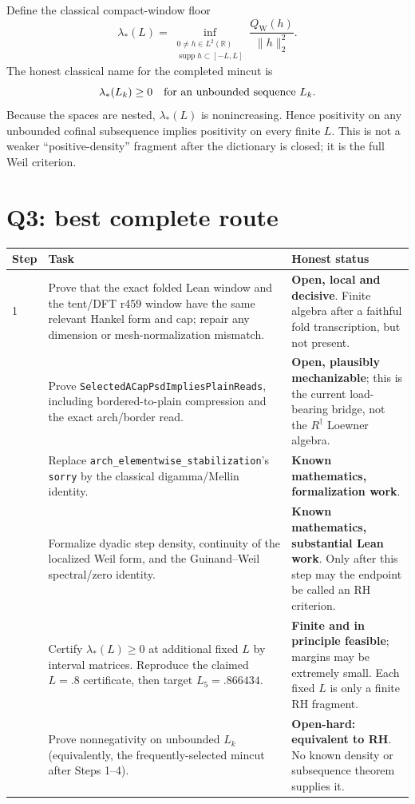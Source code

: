 \documentclass[11pt]{article}
\newcommand{\QW}{Q_{\mathrm W}}
\newcommand{\Rd}{R^{\dagger}}
\begin{document}
Define the classical compact-window floor
\[
 \lambda_*(L)=
 \inf_{\substack{0\ne h\in L^2(\mathbb R)\\
                  \operatorname{supp}h\subset[-L,L]}}
 \frac{\QW(h)}{\|h\|_2^2}.
\]
The honest classical name for the completed mincut is
\[
 \lambda_*(L_k)\ge0\quad\hbox{for an unbounded sequence }L_k.
\]
Because the spaces are nested, $\lambda_*(L)$ is nonincreasing.
Hence positivity on any unbounded cofinal subsequence implies
positivity on every finite $L$.  This is not a weaker
``positive-density'' fragment after the dictionary is closed;
it is the full Weil criterion.

\section{Q3: best complete route}

\begin{center}
\small
\begin{tabular}{@{}p{}p{}p{}@{}}
\toprule
Step & Task & Honest status\\
\midrule
1 &
Prove that the exact folded Lean window and the tent/DFT r459
window have the same relevant Hankel form and cap; repair any
dimension or mesh-normalization mismatch. &
\textbf{Open, local and decisive}.  Finite algebra after a faithful
fold transcription, but not present.\\
\addlinespace
2 &
Prove \texttt{SelectedACapPsdImpliesPlainReads}, including
bordered-to-plain compression and the exact arch/border read. &
\textbf{Open, plausibly mechanizable}; this is the current
load-bearing bridge, not the $\Rd$ Loewner algebra.\\
\addlinespace
3 &
Replace \texttt{arch\_elementwise\_stabilization}'s
\texttt{sorry} by the classical digamma/Mellin identity. &
\textbf{Known mathematics, formalization work}.\\
\addlinespace
4 &
Formalize dyadic step density, continuity of the localized Weil
form, and the Guinand--Weil spectral/zero identity. &
\textbf{Known mathematics, substantial Lean work}.  Only after
this step may the endpoint be called an RH criterion.\\
\addlinespace
5 &
Certify $\lambda_*(L)\ge0$ at additional fixed $L$ by
interval matrices.  Reproduce the claimed $L=.8$ certificate,
then target $L_5=.866434$. &
\textbf{Finite and in principle feasible}; margins may be extremely
small.  Each fixed $L$ is only a finite RH fragment.\\
\addlinespace
6 &
Prove nonnegativity on unbounded $L_k$ (equivalently, the
frequently-selected mincut after Steps 1--4). &
\textbf{Open-hard: equivalent to RH}.  No known density or
subsequence theorem supplies it.\\
\bottomrule
\end{tabular}
\end{center}
\end{document}
